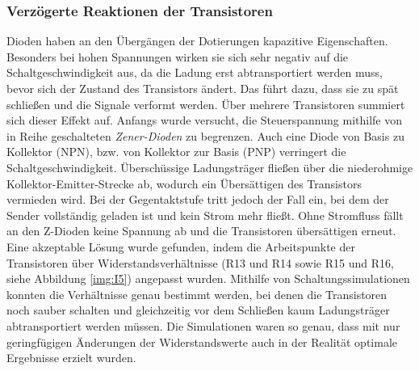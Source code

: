 \subsubsection{Verzögerte Reaktionen der Transistoren}
Dioden haben an den Übergängen der Dotierungen kapazitive Eigenschaften. Besonders bei hohen Spannungen wirken sie sich sehr negativ auf die Schaltgeschwindigkeit aus, da die Ladung erst abtransportiert werden muss, bevor sich der Zustand des Transistors ändert. Das führt dazu, dass sie zu spät schließen und die Signale verformt werden. Über mehrere Transistoren summiert sich dieser Effekt auf. Anfangs wurde versucht, die Steuerspannung mithilfe von in Reihe geschalteten \textit{Zener-Dioden} zu begrenzen. Auch eine Diode von Basis zu Kollektor (NPN), bzw. von Kollektor zur Basis (PNP) verringert die Schaltgeschwindigkeit. Überschüssige Ladungsträger fließen über die niederohmige Kollektor-Emitter-Strecke ab, wodurch ein Übersättigen des Transistors vermieden wird. Bei der Gegentaktstufe tritt jedoch der Fall ein, bei dem der Sender vollständig geladen ist und kein Strom mehr fließt. Ohne Stromfluss fällt an den Z-Dioden keine Spannung ab und die Transistoren übersättigen erneut.\\ %
Eine akzeptable Lösung wurde gefunden, indem die Arbeitspunkte der Transistoren über Widerstandsverhältnisse (R13 und R14 sowie R15 und R16, siehe Abbildung \ref{img:I5}) angepasst wurden. Mithilfe von Schaltungssimulationen konnten die Verhältnisse genau bestimmt werden, bei denen die Transistoren noch sauber schalten und gleichzeitig vor dem Schließen kaum Ladungsträger abtransportiert werden müssen. Die Simulationen waren so genau, dass mit nur geringfügigen Änderungen der Widerstandswerte auch in der Realität optimale Ergebnisse erzielt wurden.

